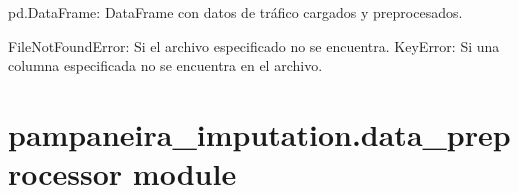 \documentclass[letterpaper,10pt,english]{sphinxmanual}
\begin{document}
\begin{fulllineitems}
\begin{description}
\sphinxAtStartPar
pd.DataFrame: DataFrame con datos de tráfico cargados y preprocesados.

\sphinxAtStartPar
FileNotFoundError: Si el archivo especificado no se encuentra.
KeyError: Si una columna especificada no se encuentra en el archivo.

\end{description}

\end{fulllineitems}



\section{pampaneira\_imputation.data\_preprocessor module}
\label{\detokenize{pampaneira_imputation:module-pampaneira_imputation.data_preprocessor}}\label{\detokenize{pampaneira_imputation:pampaneira-imputation-data-preprocessor-module}}
\end{document}
